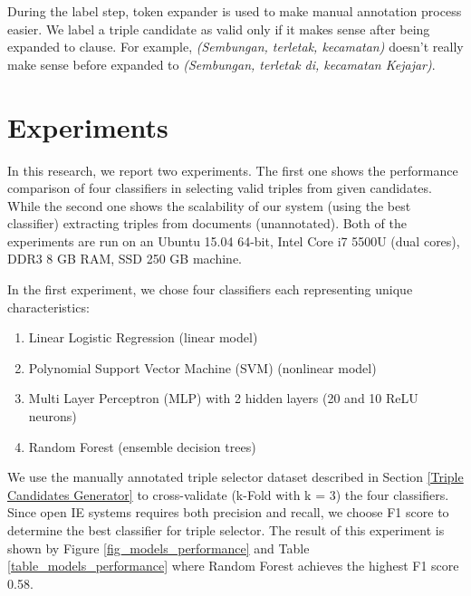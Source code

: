 \documentclass[conference,compsoc]{IEEEtran}
\begin{document}
During the label step, token expander is used to make manual annotation process easier. We label a triple candidate as valid only if it makes sense after being expanded to clause. For example, \textit{(Sembungan, terletak, kecamatan)} doesn't really make sense before expanded to \textit{(Sembungan, terletak di, kecamatan Kejajar)}.

\section{Experiments} \label{Experiments}

In this research, we report two experiments. The first one shows the performance comparison of four classifiers in selecting valid triples from given candidates. While the second one shows the scalability of our system (using the best classifier) extracting triples from documents (unannotated). Both of the experiments are run on an Ubuntu 15.04 64-bit, Intel Core i7 5500U (dual cores), DDR3 8 GB RAM, SSD 250 GB machine.

In the first experiment, we chose four classifiers each representing unique characteristics: 

\begin{enumerate}
\item Linear Logistic Regression\cite{fan2008liblinear} (linear model)
\item Polynomial Support Vector Machine (SVM)\cite{chang2011libsvm} (nonlinear model)
\item Multi Layer Perceptron (MLP)\cite{hinton1989connectionist} with 2 hidden layers (20 and 10 ReLU\cite{nair2010rectified} neurons)
\item Random Forest\cite{wasserman2015grid} (ensemble decision trees)
\end{enumerate}
  
We use the manually annotated triple selector dataset described in Section \ref{Triple Candidates Generator} to cross-validate\cite{kohavi1995study} (k-Fold with k = 3) the four classifiers. Since open IE systems requires both precision and recall\cite{angeli2015leveraging}, we choose F1 score to determine the best classifier for triple selector. The result of this experiment is shown by Figure \ref{fig_models_performance} and Table \ref{table_models_performance} where Random Forest achieves the highest F1 score 0.58.
\end{document}
